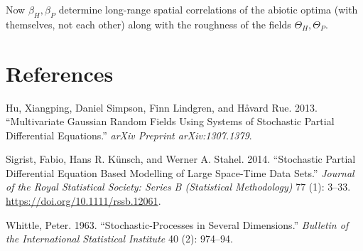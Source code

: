 \documentclass{article}
\begin{document}
Now \(\beta_H,\beta_P\) determine long-range spatial correlations of the
abiotic optima (with themselves, not each other) along with the
roughness of the fields \(\Theta_H,\Theta_P\).

\hypertarget{references}{%
\section*{References}\label{references}}

\hypertarget{refs}{}
\leavevmode\hypertarget{ref-hu2013multivariate}{}%
Hu, Xiangping, Daniel Simpson, Finn Lindgren, and Håvard Rue. 2013.
``Multivariate Gaussian Random Fields Using Systems of Stochastic
Partial Differential Equations.'' \emph{arXiv Preprint arXiv:1307.1379}.

\leavevmode\hypertarget{ref-Sigrist2014}{}%
Sigrist, Fabio, Hans R. Künsch, and Werner A. Stahel. 2014. ``Stochastic
Partial Differential Equation Based Modelling of Large Space-Time Data
Sets.'' \emph{Journal of the Royal Statistical Society: Series B
(Statistical Methodology)} 77 (1): 3--33.
\url{https://doi.org/10.1111/rssb.12061}.

\leavevmode\hypertarget{ref-whittle1963stochastic}{}%
Whittle, Peter. 1963. ``Stochastic-Processes in Several Dimensions.''
\emph{Bulletin of the International Statistical Institute} 40 (2):
974--94.



\end{document}
